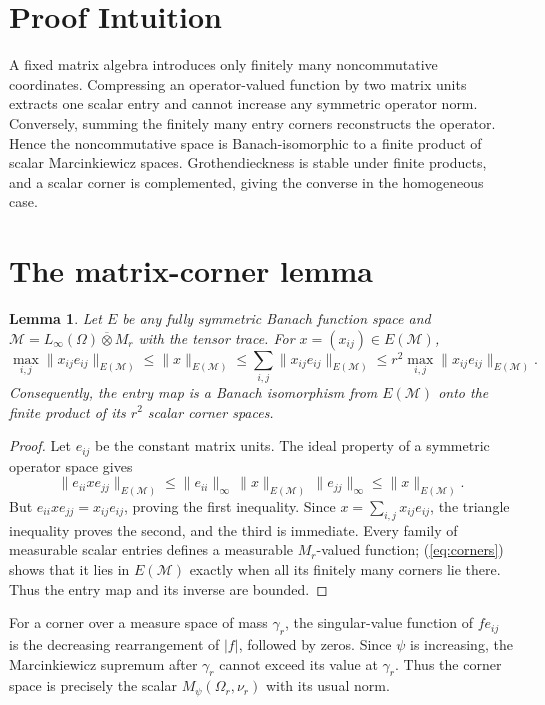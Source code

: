 \documentclass[10pt]{article}
\newtheorem{lemma}{Lemma}
\newcommand{\M}{\mathcal M}
\begin{document}
\section{Proof Intuition}
A fixed matrix algebra introduces only finitely many noncommutative
coordinates.  Compressing an operator-valued function by two matrix units
extracts one scalar entry and cannot increase any symmetric operator norm.
Conversely, summing the finitely many entry corners reconstructs the
operator.  Hence the noncommutative space is Banach-isomorphic to a finite
product of scalar Marcinkiewicz spaces.  Grothendieckness is stable under
finite products, and a scalar corner is complemented, giving the converse in
the homogeneous case.

\section{The matrix-corner lemma}
\begin{lemma}\label{lem:corners}
Let $E$ be any fully symmetric Banach function space and
$\M=L_\infty(\Omega)\overline\otimes M_r$ with the tensor trace.  For
$x=(x_{ij})\in E(\M)$,
\begin{equation}\label{eq:corners}
 \max_{i,j}\|x_{ij}e_{ij}\|_{E(\M)}
 \le \|x\|_{E(\M)}
 \le \sum_{i,j}\|x_{ij}e_{ij}\|_{E(\M)}
 \le r^2\max_{i,j}\|x_{ij}e_{ij}\|_{E(\M)}.
\end{equation}
Consequently, the entry map is a Banach isomorphism from $E(\M)$ onto the
finite product of its $r^2$ scalar corner spaces.
\end{lemma}

\begin{proof}
Let $e_{ij}$ be the constant matrix units.  The ideal property of a symmetric
operator space gives
\[
 \|e_{ii}xe_{jj}\|_{E(\M)}\le
 \|e_{ii}\|_\infty\,\|x\|_{E(\M)}\,\|e_{jj}\|_\infty
 \le \|x\|_{E(\M)}.
\]
But $e_{ii}xe_{jj}=x_{ij}e_{ij}$, proving the first inequality.  Since
$x=\sum_{i,j}x_{ij}e_{ij}$, the triangle inequality proves the second, and
the third is immediate.  Every family of measurable scalar entries defines
a measurable $M_r$-valued function; (\ref{eq:corners}) shows that it lies in
$E(\M)$ exactly when all its finitely many corners lie there.  Thus the entry
map and its inverse are bounded.
\end{proof}

For a corner over a measure space of mass $\gamma_r$, the singular-value
function of $fe_{ij}$ is the decreasing rearrangement of $|f|$, followed by
zeros.  Since $\psi$ is increasing, the Marcinkiewicz supremum after
$\gamma_r$ cannot exceed its value at $\gamma_r$.  Thus the corner space is
precisely the scalar $M_\psi(\Omega_r,\nu_r)$ with its usual norm.
\end{document}
